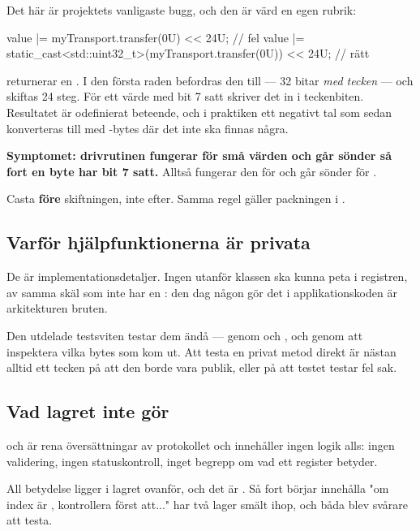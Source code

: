 Det här är projektets vanligaste bugg, och den är värd en egen rubrik:

\begin{cppcode}
value |= myTransport.transfer(0U) << 24U;                             // fel
value |= static_cast<std::uint32_t>(myTransport.transfer(0U)) << 24U; // rätt
\end{cppcode}

 returnerar en . I den första raden befordras den till
 --- 32 bitar \emph{med tecken} --- och skiftas 24 steg. För ett värde med bit 7 satt
skriver det in i teckenbiten. Resultatet är odefinierat beteende, och i praktiken ett negativt tal
som sedan konverteras till  med -bytes där det inte ska finnas
några.

\textbf{Symptomet: drivrutinen fungerar för små värden och går sönder så fort en byte har bit 7
satt.} Alltså fungerar den för  och går sönder för .

\begin{aside}
\note[Regel] Casta \textbf{före} skiftningen, inte efter. Samma regel gäller packningen i
.
\end{aside}

\subsection{Varför hjälpfunktionerna är privata}

De är implementationsdetaljer. Ingen utanför klassen ska kunna peta i registren, av samma skäl som
 inte har en : den dag någon gör det i
applikationskoden är arkitekturen bruten.

Den utdelade testsviten testar dem ändå --- genom  och , och genom att
inspektera vilka bytes som kom ut. Att testa en privat metod direkt är nästan alltid ett tecken på
att den borde vara publik, eller på att testet testar fel sak.

\subsection{Vad lagret inte gör}

 och  är rena översättningar av protokollet och innehåller ingen
logik alls: ingen validering, ingen statuskontroll, inget begrepp om vad ett register betyder.

All betydelse ligger i lagret ovanför, och det är . Så fort 
börjar innehålla "om index är , kontrollera först att..." har två lager smält
ihop, och båda blev svårare att testa.
